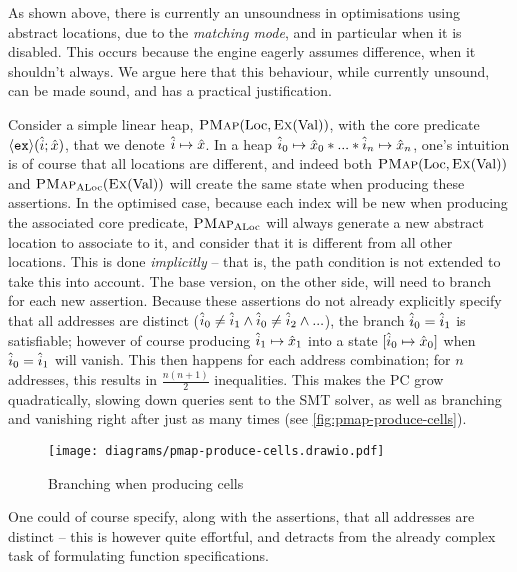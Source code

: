 As shown above, there is currently an unsoundness in optimisations using abstract locations, due to the \emph{matching mode}, and in particular when it is disabled. This occurs because the engine eagerly assumes difference, when it shouldn't always. We argue here that this behaviour, while currently unsound, can be made sound, and has a practical justification.

Consider a simple linear heap, $\textsc{PMap}(\text{Loc}, \textsc{Ex}(\text{Val}))$, with the core predicate $\left<\texttt{ex}\right>\!(\hat{i};\hat{x})$, that we denote $\hat{i}\mapsto \hat{x}$. In a heap $\hat{i}_0\mapsto \hat{x}_0 * ... * \hat{i}_n\mapsto \hat{x}_n$, one's intuition is of course that all locations are different, and indeed both $\textsc{PMap}(\text{Loc}, \textsc{Ex}(\text{Val}))$ and $\textsc{PMap}_{\text{ALoc}}(\textsc{Ex}(\text{Val}))$ will create the same state when producing these assertions. In the optimised case, because each index will be new when producing the associated core predicate, $\textsc{PMap}_{\text{ALoc}}$ will always generate a new abstract location to associate to it, and consider that it is different from all other locations. This is done \emph{implicitly} -- that is, the path condition is not extended to take this into account. The base version, on the other side, will need to branch for each new assertion. Because these assertions do not already explicitly specify that all addresses are distinct (${\hat{i}_0 \neq \hat{i}_1 \land \hat{i}_0 \neq \hat{i}_2 \land ...}$), the branch $\hat{i}_0 = \hat{i}_1$ is satisfiable; however of course producing $\hat{i}_1 \mapsto \hat{x}_1$ into a state $[\hat{i}_0\mapsto \hat{x}_0]$ when $\hat{i}_0 = \hat{i}_1$ will vanish. This then happens for each address combination; for $n$ addresses, this results in $\frac{n(n+1)}{2}$ inequalities. This makes the PC grow quadratically, slowing down queries sent to the SMT solver, as well as branching and vanishing right after just as many times (see \autoref{fig:pmap-produce-cells}).

\begin{figure}
	\centering
	\texttt{[image: diagrams/pmap-produce-cells.drawio.pdf]}
	\caption{Branching when producing cells}
	\label{fig:pmap-produce-cells}
\end{figure}

One could of course specify, along with the assertions, that all addresses are distinct -- this is however quite effortful, and detracts from the already complex task of formulating function specifications.

